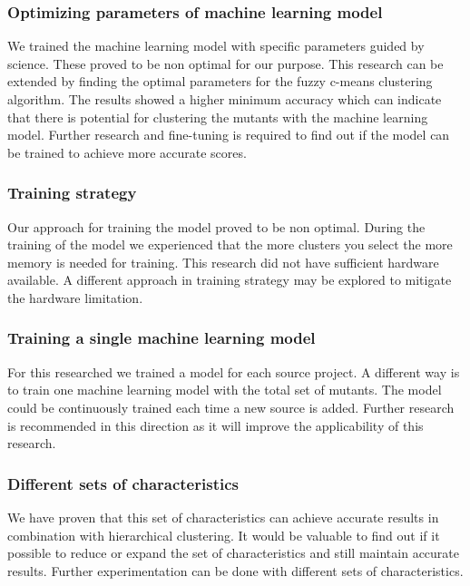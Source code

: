\documentclass[../main]{subfiles}
\begin{document}
\subsubsection{Optimizing parameters of machine learning model}
We trained the machine learning model with specific parameters guided by science. 
These proved to be non optimal for our purpose.
This research can be extended by finding the optimal parameters for the fuzzy c-means clustering algorithm.
The results showed a higher minimum accuracy which can indicate that there is potential for clustering the mutants with the machine learning model.
Further research and fine-tuning is required to find out if the model can be trained to achieve more accurate scores.

\subsubsection{Training strategy}
Our approach for training the model proved to be non optimal.
During the training of the model we experienced that the more clusters you select the more memory is needed for training.
This research did not have sufficient hardware available.
A different approach in training strategy may be explored to mitigate the hardware limitation.

\subsubsection{Training a single machine learning model}
For this researched we trained a model for each source project. 
A different way is to train one machine learning model with the total set of mutants.
The model could be continuously trained each time a new source is added.
Further research is recommended in this direction as it will improve the applicability of this research.

\subsubsection{Different sets of characteristics}
We have proven that this set of characteristics can achieve accurate results in combination with hierarchical clustering.
It would be valuable to find out if it possible to reduce or expand the set of characteristics and still maintain accurate results.
Further experimentation can be done with different sets of characteristics.
\end{document}
